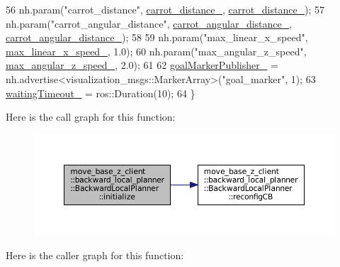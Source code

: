 \begin{DoxyCode}
56     nh.param(\textcolor{stringliteral}{"carrot\_distance"}, \hyperlink{classmove__base__z__client_1_1backward__local__planner_1_1BackwardLocalPlanner_a6dc3aa0ff63f9f7d0aae852755734b5d}{carrot\_distance\_}, 
      \hyperlink{classmove__base__z__client_1_1backward__local__planner_1_1BackwardLocalPlanner_a6dc3aa0ff63f9f7d0aae852755734b5d}{carrot\_distance\_});
57     nh.param(\textcolor{stringliteral}{"carrot\_angular\_distance"}, \hyperlink{classmove__base__z__client_1_1backward__local__planner_1_1BackwardLocalPlanner_a3d6cba0748b85a67f5dfd7740de9530f}{carrot\_angular\_distance\_}, 
      \hyperlink{classmove__base__z__client_1_1backward__local__planner_1_1BackwardLocalPlanner_a3d6cba0748b85a67f5dfd7740de9530f}{carrot\_angular\_distance\_});
58 
59     nh.param(\textcolor{stringliteral}{"max\_linear\_x\_speed"}, \hyperlink{classmove__base__z__client_1_1backward__local__planner_1_1BackwardLocalPlanner_a287325b11b5eb8a76b6924b42f859e25}{max\_linear\_x\_speed\_}, 1.0);
60     nh.param(\textcolor{stringliteral}{"max\_angular\_z\_speed"}, \hyperlink{classmove__base__z__client_1_1backward__local__planner_1_1BackwardLocalPlanner_a8b5cbc273dfcf1c5e15ac4475b45ca97}{max\_angular\_z\_speed\_}, 2.0);
61 
62     \hyperlink{classmove__base__z__client_1_1backward__local__planner_1_1BackwardLocalPlanner_a7228d3fe90bc48b486e5c46d6ac5e815}{goalMarkerPublisher\_} = nh.advertise<visualization\_msgs::MarkerArray>(\textcolor{stringliteral}{"goal\_marker"},
       1);
63     \hyperlink{classmove__base__z__client_1_1backward__local__planner_1_1BackwardLocalPlanner_a682a688c42630a6ada49ab462cec38da}{waitingTimeout\_} = ros::Duration(10);
64 \}
\end{DoxyCode}
Here is the call graph for this function\+:
\nopagebreak
\begin{figure}[H]
\begin{center}
\leavevmode
\includegraphics[width=350pt]{classmove__base__z__client_1_1backward__local__planner_1_1BackwardLocalPlanner_acdb083587fd77dc2c8d617751ac08f74_cgraph}
\end{center}
\end{figure}
Here is the caller graph for this function\+:
